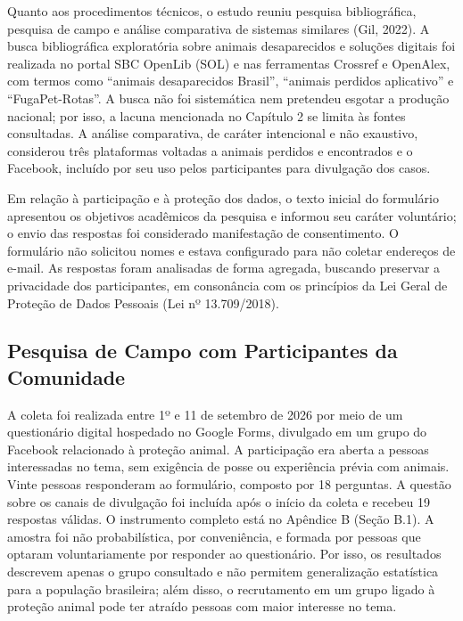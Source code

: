 Quanto aos procedimentos técnicos, o estudo reuniu pesquisa bibliográfica, pesquisa de campo e análise comparativa de sistemas similares (Gil, 2022). A busca bibliográfica exploratória sobre animais desaparecidos e soluções digitais foi realizada no portal SBC OpenLib (SOL) e nas ferramentas Crossref e OpenAlex, com termos como ``animais desaparecidos Brasil'', ``animais perdidos aplicativo'' e ``FugaPet-Rotas''. A busca não foi sistemática nem pretendeu esgotar a produção nacional; por isso, a lacuna mencionada no Capítulo 2 se limita às fontes consultadas. A análise comparativa, de caráter intencional e não exaustivo, considerou três plataformas voltadas a animais perdidos e encontrados e o Facebook, incluído por seu uso pelos participantes para divulgação dos casos.

Em relação à participação e à proteção dos dados, o texto inicial do formulário apresentou os objetivos acadêmicos da pesquisa e informou seu caráter voluntário; o envio das respostas foi considerado manifestação de consentimento. O formulário não solicitou nomes e estava configurado para não coletar endereços de e-mail. As respostas foram analisadas de forma agregada, buscando preservar a privacidade dos participantes, em consonância com os princípios da Lei Geral de Proteção de Dados Pessoais (Lei nº 13.709/2018).

\subsection{Pesquisa de Campo com Participantes da Comunidade}

A coleta foi realizada entre 1º e 11 de setembro de 2026 por meio de um questionário digital hospedado no Google Forms, divulgado em um grupo do Facebook relacionado à proteção animal. A participação era aberta a pessoas interessadas no tema, sem exigência de posse ou experiência prévia com animais. Vinte pessoas responderam ao formulário, composto por 18 perguntas. A questão sobre os canais de divulgação foi incluída após o início da coleta e recebeu 19 respostas válidas. O instrumento completo está no Apêndice B (Seção B.1). A amostra foi não probabilística, por conveniência, e formada por pessoas que optaram voluntariamente por responder ao questionário. Por isso, os resultados descrevem apenas o grupo consultado e não permitem generalização estatística para a população brasileira; além disso, o recrutamento em um grupo ligado à proteção animal pode ter atraído pessoas com maior interesse no tema.

